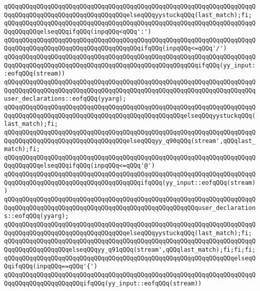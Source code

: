 \verb|qQQqqQQqqQQqqQQqqQQqqQQqqQQqqQQqqQQqqQQqqQQqqQQqqQQqqQQqqQQqqQQqqQQqqQQqqQQqqQQqqQQqqQQqqQQqqQQqqQQqqQQqelseqQQqyystuckqQQq(last_match);fi;|\newline
\verb|qQQqqQQqqQQqqQQqqQQqqQQqqQQqqQQqqQQqqQQqqQQqqQQqqQQqqQQqqQQqqQQqqQQqqQQqqQQqqQQqelseqQQqifqQQq(inpqQQq<qQQq':')|\newline
\verb|qQQqqQQqqQQqqQQqqQQqqQQqqQQqqQQqqQQqqQQqqQQqqQQqqQQqqQQqqQQqqQQqqQQqqQQqqQQqqQQqqQQqqQQqqQQqqQQqqQQqqQQqqQQqifqQQq(inpqQQq<=qQQq'/')|\newline
\verb|qQQqqQQqqQQqqQQqqQQqqQQqqQQqqQQqqQQqqQQqqQQqqQQqqQQqqQQqqQQqqQQqqQQqqQQqqQQqqQQqqQQqqQQqqQQqqQQqqQQqqQQqqQQqqQQqqQQqqQQqqQQqifqQQq(yy_input::eofqQQq(stream))|\newline
\verb|qQQqqQQqqQQqqQQqqQQqqQQqqQQqqQQqqQQqqQQqqQQqqQQqqQQqqQQqqQQqqQQqqQQqqQQqqQQqqQQqqQQqqQQqqQQqqQQqqQQqqQQqqQQqqQQqqQQqqQQqqQQqqQQqqQQqqQQqqQQquser_declarations::eofqQQq(yyarg);|\newline
\verb|qQQqqQQqqQQqqQQqqQQqqQQqqQQqqQQqqQQqqQQqqQQqqQQqqQQqqQQqqQQqqQQqqQQqqQQqqQQqqQQqqQQqqQQqqQQqqQQqqQQqqQQqqQQqqQQqqQQqqQQqelseqQQqyystuckqQQq(last_match);fi;|\newline
\verb|qQQqqQQqqQQqqQQqqQQqqQQqqQQqqQQqqQQqqQQqqQQqqQQqqQQqqQQqqQQqqQQqqQQqqQQqqQQqqQQqqQQqqQQqqQQqqQQqqQQqqQQqelseqQQqyy_q90qQQq(stream',qQQqlast_match);fi;|\newline
\verb|qQQqqQQqqQQqqQQqqQQqqQQqqQQqqQQqqQQqqQQqqQQqqQQqqQQqqQQqqQQqqQQqqQQqqQQqqQQqqQQqelseqQQqifqQQq(inpqQQq<=qQQq'@')|\newline
\verb|qQQqqQQqqQQqqQQqqQQqqQQqqQQqqQQqqQQqqQQqqQQqqQQqqQQqqQQqqQQqqQQqqQQqqQQqqQQqqQQqqQQqqQQqqQQqqQQqqQQqqQQqqQQqifqQQq(yy_input::eofqQQq(stream))|\newline
\verb|qQQqqQQqqQQqqQQqqQQqqQQqqQQqqQQqqQQqqQQqqQQqqQQqqQQqqQQqqQQqqQQqqQQqqQQqqQQqqQQqqQQqqQQqqQQqqQQqqQQqqQQqqQQqqQQqqQQqqQQqqQQquser_declarations::eofqQQq(yyarg);|\newline
\verb|qQQqqQQqqQQqqQQqqQQqqQQqqQQqqQQqqQQqqQQqqQQqqQQqqQQqqQQqqQQqqQQqqQQqqQQqqQQqqQQqqQQqqQQqqQQqqQQqqQQqqQQqelseqQQqyystuckqQQq(last_match);fi;|\newline
\verb|qQQqqQQqqQQqqQQqqQQqqQQqqQQqqQQqqQQqqQQqqQQqqQQqqQQqqQQqqQQqqQQqqQQqqQQqqQQqqQQqqQQqqQQqelseqQQqyy_q91qQQq(stream',qQQqlast_match);fi;fi;fi;|\newline
\verb|qQQqqQQqqQQqqQQqqQQqqQQqqQQqqQQqqQQqqQQqqQQqqQQqqQQqqQQqqQQqqQQqelseqQQqifqQQq(inpqQQq==qQQq'{')|\newline
\verb|qQQqqQQqqQQqqQQqqQQqqQQqqQQqqQQqqQQqqQQqqQQqqQQqqQQqqQQqqQQqqQQqqQQqqQQqqQQqqQQqqQQqqQQqqQQqifqQQq(yy_input::eofqQQq(stream))|\newline
